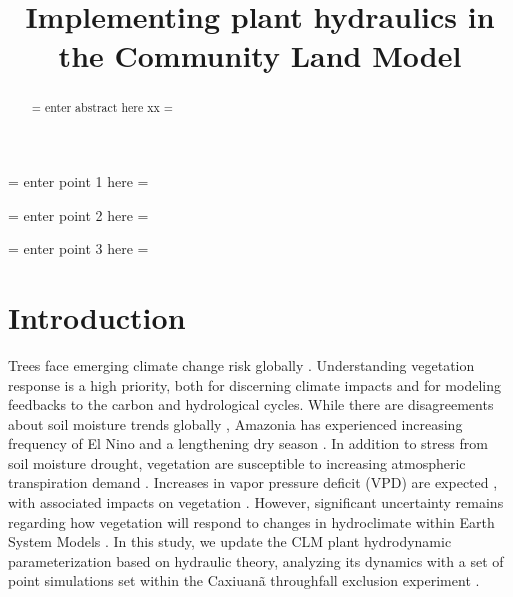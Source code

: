 \documentclass[draft,linenumbers]{agujournal}
\begin{document}
\title{Implementing plant hydraulics in the Community Land Model}



\begin{keypoints}
\item = enter point 1 here = 
\item = enter point 2 here = 
\item = enter point 3 here = 
\end{keypoints}


\begin{abstract}
= enter abstract here xx =
\end{abstract}


\section{Introduction}

Trees face emerging climate change risk globally \citep{allen2010,anderegg2013b}.
Understanding vegetation response is a high priority, both for discerning climate impacts and for modeling feedbacks to the carbon and hydrological cycles.
While there are disagreements about soil moisture trends globally \citep{dai2013,sheffield2012}, 
Amazonia has experienced increasing frequency of El Nino \citep{cai2014} and a lengthening dry season \citep{fu2013}.
In addition to stress from soil moisture drought, vegetation are susceptible to increasing atmospheric transpiration demand \citep{restaino2016,novick2016b}.
Increases in vapor pressure deficit (VPD) are expected \citep{ficklin2017,seager2015}, with associated impacts on vegetation \citep{williams2013,mcdowell2015}.
However, significant uncertainty remains regarding how vegetation will respond to changes in hydroclimate within Earth System Models \citep{dekauwe2017,friedlingstein2014}.
In this study, we update the CLM plant hydrodynamic parameterization based on hydraulic theory, 
analyzing its dynamics with a set of point simulations set within the Caxiuan\~a throughfall exclusion experiment \citep{fisher2006}.
\end{document}
